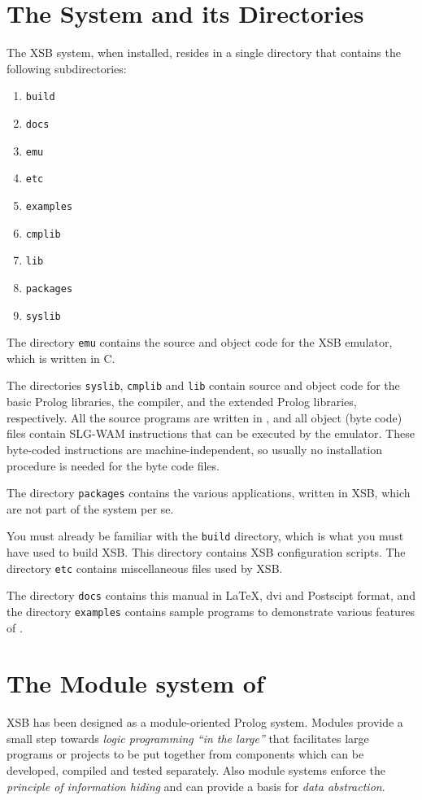 \section{The System and its Directories}
The XSB system, when installed, resides in a single directory that
contains the following subdirectories:
\begin{enumerate}
\item {\tt build}
\item {\tt docs}
\item {\tt emu}
\item {\tt etc}
\item {\tt examples}
\item {\tt cmplib}
\item {\tt lib}
\item {\tt packages}
\item {\tt syslib}
\end{enumerate}

The directory {\tt emu} contains the source and object code for
the XSB emulator, which is written in C.

The directories {\tt syslib}, {\tt cmplib} and {\tt lib} contain source
and object code for the basic Prolog libraries, the compiler, and the
extended Prolog libraries, respectively.  All the source programs
are written in \ourprolog, and all object (byte code) files contain SLG-WAM
instructions that can be executed by the emulator.  These byte-coded 
instructions are machine-independent, so usually no installation 
procedure is needed for the byte code files.

The directory {\tt packages} contains the various applications, written in
XSB, which are not part of the system per se.

You must already be familiar with the {\tt build} directory, which is what
you must have used to build XSB. This directory contains XSB configuration
scripts.  The directory {\tt etc} contains miscellaneous files used by XSB.

The directory {\tt docs} contains this manual in \LaTeX, dvi and Postscipt
format, and the directory {\tt examples} contains sample programs to 
demonstrate various features of \ourprolog.


\section{The Module system of \ourprolog} \label{Modules}
XSB has been designed as a module-oriented Prolog system.  Modules
provide a small step towards {\em logic programming ``in the large''}
that facilitates large programs or projects to be put together from
components which can be developed, compiled and tested separately.
Also module systems enforce the {\em principle of information hiding}
and can provide a basis for {\em data abstraction}.

